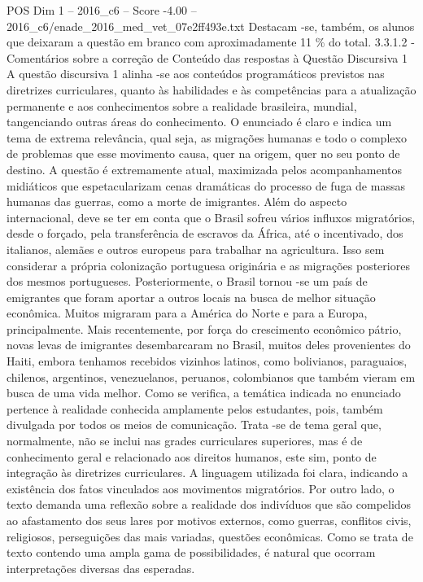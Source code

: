 \begin{textsample}{POS Dim 1 – 2016\_c6 – Score -4.00 – 2016\_c6/enade\_2016\_med\_vet\_07e2ff493e.txt}
Destacam -se, também, os alunos que deixaram a questão em branco com aproximadamente 11 \% do total. 3.3.1.2 - Comentários sobre a correção de Conteúdo das respostas à Questão Discursiva 1 A questão discursiva 1 alinha -se aos conteúdos programáticos previstos nas diretrizes curriculares, quanto às habilidades e às competências para a atualização permanente e aos conhecimentos sobre a realidade brasileira, mundial, tangenciando outras áreas do conhecimento.
O enunciado é claro e indica um tema de extrema relevância, qual seja, as migrações humanas e todo o complexo de problemas que esse movimento causa, quer na origem, quer no seu ponto de destino.
A questão é extremamente atual, maximizada pelos acompanhamentos midiáticos que espetacularizam cenas dramáticas do processo de fuga de massas humanas das guerras, como a morte de imigrantes.
Além do aspecto internacional, deve se ter em conta que o Brasil sofreu vários influxos migratórios, desde o forçado, pela transferência de escravos da África, até o incentivado, dos italianos, alemães e outros europeus para trabalhar na agricultura.
Isso sem considerar a própria colonização portuguesa originária e as migrações posteriores dos mesmos portugueses.
Posteriormente, o Brasil tornou -se um país de emigrantes que foram aportar a outros locais na busca de melhor situação econômica.
Muitos migraram para a América do Norte e para a Europa, principalmente.
Mais recentemente, por força do crescimento econômico pátrio, novas levas de imigrantes desembarcaram no Brasil, muitos deles provenientes do Haiti, embora tenhamos recebidos vizinhos latinos, como bolivianos, paraguaios, chilenos, argentinos, venezuelanos, peruanos, colombianos que também vieram em busca de uma vida melhor.
Como se verifica, a temática indicada no enunciado pertence à realidade conhecida amplamente pelos estudantes, pois, também divulgada por todos os meios de comunicação.
Trata -se de tema geral que, normalmente, não se inclui nas grades curriculares superiores, mas é de conhecimento geral e relacionado aos direitos humanos, este sim, ponto de integração às diretrizes curriculares.
A linguagem utilizada foi clara, indicando a existência dos fatos vinculados aos movimentos migratórios.
Por outro lado, o texto demanda uma reflexão sobre a realidade dos indivíduos que são compelidos ao afastamento dos seus lares por motivos externos, como guerras, conflitos civis, religiosos, perseguições das mais variadas, questões econômicas.
Como se trata de texto contendo uma ampla gama de possibilidades, é natural que ocorram interpretações diversas das esperadas.

\end{textsample}
